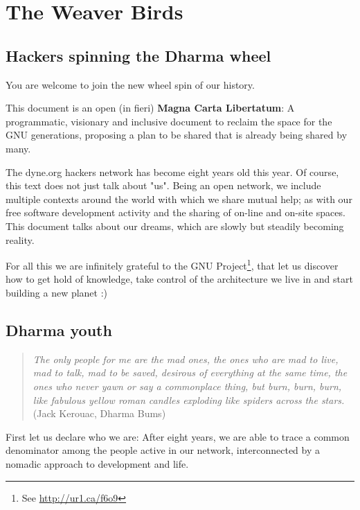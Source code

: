\begin{savequote}
\end{savequote}
\chapter{The Weaver Birds}
\label{c:weaver_birds}

\section{Hackers spinning the Dharma wheel}
\label{s:weaver_birds:dharma_wheel}

You are welcome to join the new wheel spin of our history.

This document is an open (in f\hbox{}ieri) \textbf{Magna Carta Libertatum}: A
programmatic, visionary and inclusive document to reclaim the space for the GNU
generations, proposing a plan to be shared that is already being shared by many.

The dyne.org hackers network has become eight years old this year. Of course,
this text does not just talk about "us". Being an open network, we include
multiple contexts around the world with which we share mutual help; as with our
free software development activity and the sharing of on-line and on-site
spaces. This document talks about our dreams, which are slowly but steadily
becoming reality.

For all this we are inf\hbox{}initely grateful to the GNU Project\footnote{See
\url{http://ur1.ca/f6o9}}, that let us discover how to get hold of knowledge,
take control of the architecture we live in and start building a new planet :)


\section{Dharma youth}
\label{s:weaver_birds:dharma_youth}

\begin{quote}
\textit{The only people for me are the mad ones, the ones who are mad to live,
mad to talk, mad to be saved, desirous of everything at the same time, the ones
who never yawn or say a commonplace thing, but burn, burn, burn, like fabulous
yellow roman candles exploding like spiders across the stars.} (Jack Kerouac,
Dharma Bums)
\end{quote}

F\hbox{}irst let us declare who we are: After eight years, we are able to trace
a common denominator among the people active in our network, interconnected by a
nomadic approach to development and life.

